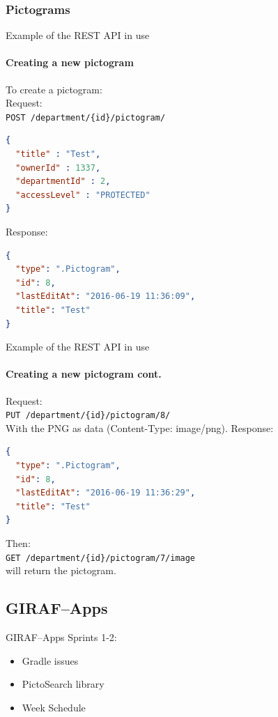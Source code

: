 \subsubsection{Pictograms}
\begin{frame}[t, fragile]{Example of the REST API in use}\framesubtitle{Creating a new pictogram}
To create a pictogram:\\
Request: \\
\texttt{POST /department/\{id\}/pictogram/}
\begin{lstlisting}[language=json]
{
  "title" : "Test",
  "ownerId" : 1337,
  "departmentId" : 2,
  "accessLevel" : "PROTECTED"
}
\end{lstlisting}
Response:
\begin{lstlisting}[language=json]
{
  "type": ".Pictogram",
  "id": 8,
  "lastEditAt": "2016-06-19 11:36:09",
  "title": "Test"
}
\end{lstlisting}
\end{frame}
\begin{frame}[t, fragile]{Example of the REST API in use}\framesubtitle{Creating a new pictogram cont.}
Request: \\
\texttt{PUT /department/\{id\}/pictogram/8/} \\
With the PNG as data (Content-Type: image/png).
Response:
\begin{lstlisting}[language=json]
{
  "type": ".Pictogram",
  "id": 8,
  "lastEditAt": "2016-06-19 11:36:29",
  "title": "Test"
}
\end{lstlisting}
Then: \\
\texttt{GET /department/\{id\}/pictogram/7/image} \\
will return the pictogram.
\end{frame}


    \subsection{GIRAF--Apps}
        \begin{frame}[t]{GIRAF--Apps}
            Sprints 1-2:
            \begin{itemize}
                \item Gradle issues
                \item PictoSearch library
                \item Week Schedule
            \end{itemize}
        \end{frame}


